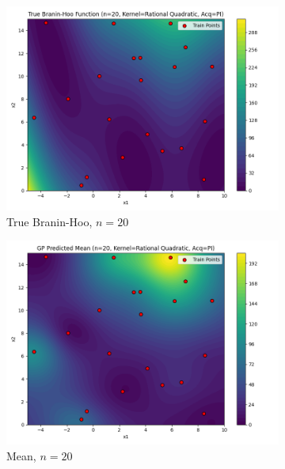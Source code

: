 \documentclass[a4paper,12pt]{article}
\begin{document}
\begin{figure}[H]
\begin{subfigure}{0.3\textwidth}
  \includegraphics[width=\linewidth]{Task-02/images/true_function_rational_quadratic_n20_PI.png}
  \caption{True Branin-Hoo, $n=20$}
\end{subfigure}
\begin{subfigure}{0.3\textwidth}
    \includegraphics[width=\linewidth]{Task-02/images/gp_mean_rational_quadratic_n20_PI.png}
    \caption{Mean, $n=20$}
\end{subfigure}
\begin{subfigure}{0.3\textwidth}

\end{subfigure}
\end{figure}
\end{document}
